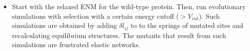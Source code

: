 \documentclass[12pt]{article}
\newcommand{\lij}{l_{ij}}
\begin{document}
\begin{itemize}
\item Start with the relaxed ENM for the wild-type protein. Then, run evolutionary simulations with selection with a certain energy cutoff ($> V_{cut}$). Such simulations are obtained by adding $\delta \lij$ to to the springs of mutated sites and recalculating equilibrium structures. The mutants that result from such simulations are frustrated elastic networks.


\end{itemize}
\end{document}
